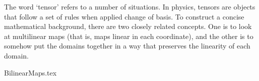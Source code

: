 \label{chap:tensors}

The word `tensor' refers to a number of situations.
In physics, tensors are objects that follow a set of rules
when applied change of basis.
To construct a concise mathematical background,
there are two closely related concepts.
One is to look at multilinear maps
(that is, maps linear in each coordinate),
and the other is to somehow put the domains together
in a way that preserves the linearity of each domain.

{BilinearMaps.tex}